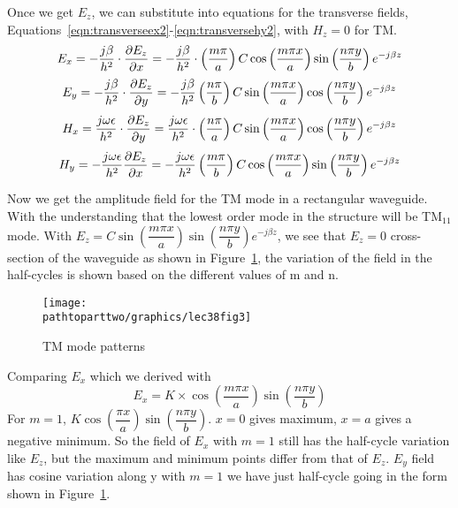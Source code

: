 Once we get $E_z$, we can substitute into equations for the transverse fields, Equations~\eqref{eqn:transverseex2}-\eqref{eqn:transversehy2}, with $H_{z} = 0$ for TM.
\begin{dmath*}
E_x = -\frac{j \beta}{h^2}\cdot\pdv{E_{z}}{x} = -\frac{j \beta}{h^{2}}\cdot\left(\frac{m\pi}{a}\right) C\cos \left(\frac{m\pi x}{a}\right)\sin \left(\frac{n\pi y}{b}\right)e^{-j \beta z}
\end{dmath*}
\begin{dmath*}
E_y = -\frac{j \beta}{h^2}\cdot \pdv{E_z}{y} = -\frac{j \beta}{h^{2}}\left(\frac{n\pi}{b}\right) C \sin\left(\frac{m\pi x}{a}\right)\cos \left(\frac{n\pi y}{b}\right)e^{-j \beta z}
\end{dmath*}
\begin{dmath*}
H_x = \frac{j \omega\epsilon}{h^2}\cdot\pdv{E_z}{y} = \frac{j \omega\epsilon}{h^{2}}\cdot\left(\frac{n\pi}{a}\right) C \sin \left(\frac{m\pi x}{a}\right)\cos \left(\frac{n\pi y}{b}\right)e^{-j \beta z}
\end{dmath*}
\begin{dmath*}
H_y =-\frac{j \omega\epsilon}{h^2}\pdv{E_z}{x} = -\frac{j \omega\epsilon}{h^{2}}\left(\frac{m\pi}{b}\right) C \cos \left(\frac{m\pi x}{a}\right)\sin \left(\frac{n\pi y}{b}\right)e^{-j \beta z}
\end{dmath*}

Now we get the amplitude field for the TM mode in a rectangular waveguide. With the understanding that the lowest order mode in the structure will be TM$_{11}$ mode. With $E_z = C\sin\left(\dfrac{m\pi x}{a}\right)\sin\left(\dfrac{n\pi y}{b}\right)e^{-j\beta z}$, we see that $E_z = 0$ cross-section of the waveguide as shown in Figure~\ref{fig:lec38fig3}, the variation of the field in the half-cycles is shown based on the different values of m and n.
\begin{figure}[h]
\centering
\texttt{[image: \\pathtoparttwo/graphics/lec38fig3]}
\caption{TM mode patterns}
\label{fig:lec38fig3}
\end{figure}
Comparing $E_x$ which we derived with 
\begin{dmath*}
E_x = K \times \cos\left(\frac{m\pi x}{a}\right)\sin\left(\frac{n\pi y}{b}\right)
\end{dmath*}
For $m=1$, $K\cos\left(\dfrac{\pi x}{a}\right)\sin\left(\dfrac{n\pi y}{b}\right)$. $x=0$ gives maximum, $x=a$ gives a negative minimum. So the field of $E_x$ with $m=1$ still has the half-cycle variation like $E_z$, but the maximum and minimum points differ from that of $E_z$. $E_y$ field has cosine variation along y with $m=1$ we have just half-cycle going in the form shown in Figure~\ref{fig:lec38fig3}.

